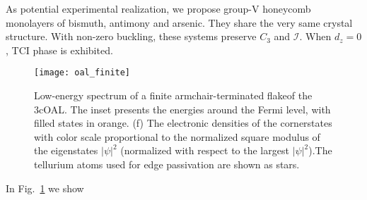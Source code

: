 As potential experimental realization, we propose group-V honeycomb monolayers of bismuth, antimony and arsenic. They share the very same crystal structure. With non-zero buckling, these systems preserve $C_3$ and $\mathcal{I}$. When $d_z = 0$, TCI phase is exhibited.


\begin{figure}
\centering
\texttt{[image: oal\_finite]}
\caption{Low-energy spectrum of a finite armchair-terminated flakeof the 3cOAL. The inset presents the energies around the Fermi level, with filled states in orange. (f) The electronic densities of the cornerstates with color scale proportional to the normalized square modulus of the eigenstates $|\psi|^2$ (normalized with respect to the largest $|\psi|^2$).The tellurium atoms used for edge passivation are shown as stars.}
\label{fig:oal_finite}
\end{figure}


In Fig.~\ref{fig:oal_finite} we show
